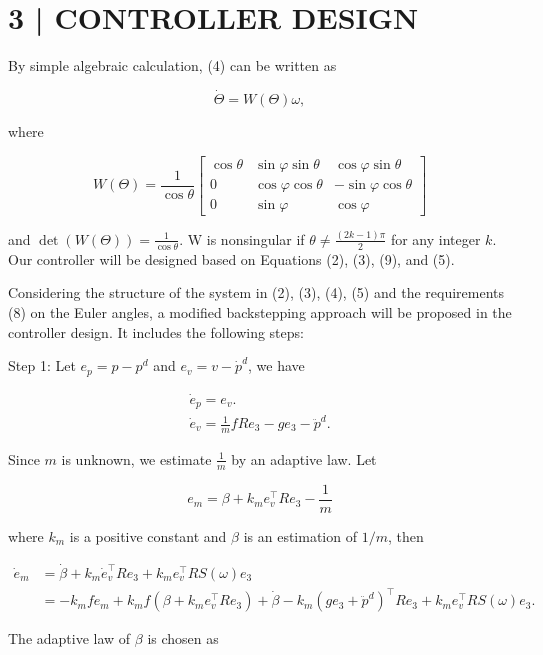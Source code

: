 \documentclass[10pt]{article}
\begin{document}
\section{3 | CONTROLLER DESIGN}
By simple algebraic calculation, (4) can be written as

$$
\dot{\Theta}=W(\Theta) \omega,
$$

where

$$
W(\Theta)=\frac{1}{\cos \theta}\left[\begin{array}{ccc}
\cos \theta & \sin \varphi \sin \theta & \cos \varphi \sin \theta \\
0 & \cos \varphi \cos \theta & -\sin \varphi \cos \theta \\
0 & \sin \varphi & \cos \varphi
\end{array}\right]
$$

and $\operatorname{det}(W(\Theta))=\frac{1}{\cos \theta}$. W is nonsingular if $\theta \neq \frac{(2 k-1) \pi}{2}$ for any integer $k$. Our controller will be designed based on Equations (2), (3), (9), and (5).

Considering the structure of the system in (2), (3), (4), (5) and the requirements (8) on the Euler angles, a modified backstepping approach will be proposed in the controller design. It includes the following steps:

Step 1: Let $e_{p}=p-p^{d}$ and $e_{v}=v-\dot{p}^{d}$, we have

$$
\begin{gathered}
\dot{e}_{p}=e_{v} . \\
\dot{e}_{v}=\frac{1}{m} f R e_{3}-g e_{3}-\ddot{p}^{d} .
\end{gathered}
$$

Since $m$ is unknown, we estimate $\frac{1}{m}$ by an adaptive law. Let

$$
e_{m}=\beta+k_{m} e_{v}^{\top} R e_{3}-\frac{1}{m}
$$

where $k_{m}$ is a positive constant and $\beta$ is an estimation of $1 / m$, then

$$
\begin{aligned}
\dot{e}_{m} & =\dot{\beta}+k_{m} \dot{e}_{v}^{\top} R e_{3}+k_{m} e_{v}^{\top} R S(\omega) e_{3} \\
& =-k_{m} f e_{m}+k_{m} f\left(\beta+k_{m} e_{v}^{\top} R e_{3}\right)+\dot{\beta}-k_{m}\left(g e_{3}+\ddot{p}^{d}\right)^{\top} R e_{3}+k_{m} e_{v}^{\top} R S(\omega) e_{3} .
\end{aligned}
$$

The adaptive law of $\beta$ is chosen as
\end{document}
